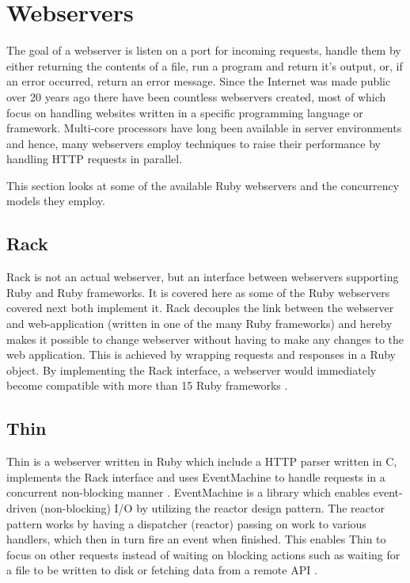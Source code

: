 \section{Webservers}
\label{webservers}

The goal of a webserver is listen on a port for incoming requests, handle them
by either returning the contents of a file, run a program and return it's
output, or, if an error occurred, return an error message. Since the Internet was
made public over 20 years ago there have been countless webservers created, most
of which focus on handling websites written in a specific programming language
or framework. Multi-core processors have long been available in server
environments and hence, many webservers employ techniques to raise their
performance by handling HTTP requests in parallel.

This section looks at some of the available Ruby webservers and the
concurrency models they employ.

\subsection{Rack}
Rack is not an actual webserver, but an interface between webservers
supporting Ruby and Ruby frameworks. It is covered here as some of the Ruby
webservers covered next both implement it. Rack decouples the link between the
webserver and web-application (written in one of the many Ruby frameworks) and
hereby makes it possible to change webserver without having to make any
changes to the web application. This is achieved by wrapping requests and
responses in a Ruby object. By implementing the Rack interface, a webserver
would immediately become compatible with more than 15 Ruby frameworks
\cite{rackspec}.

\subsection{Thin}
Thin is a webserver written in Ruby which include a HTTP parser written in C,
implements the Rack interface and uses EventMachine to handle requests in a
concurrent non-blocking manner \cite{thin}. EventMachine is a library which enables
event-driven (non-blocking) I/O by utilizing the reactor design pattern. The
reactor pattern works by having a dispatcher (reactor) passing on work to
various handlers, which then in turn fire an event when finished. This enables
Thin to focus on other requests instead of waiting on blocking actions such as
waiting for a file to be written to disk or fetching data from a remote API
\cite{reactor}.

